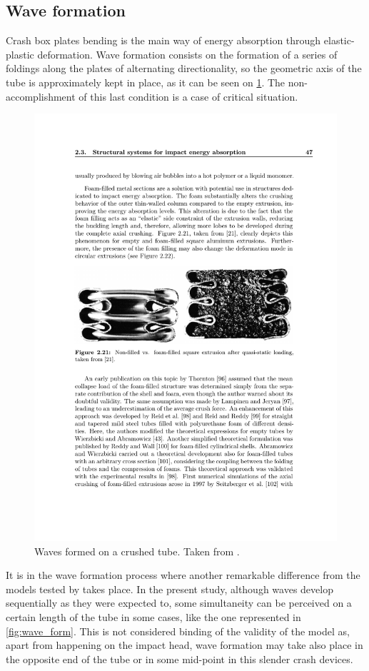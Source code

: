 \documentclass[cmfonts]{witpress}
\begin{document}
\subsection{Wave formation}
\label{sec:wave_formation}

Crash box plates bending is the main way of energy absorption through elastic-plastic deformation. Wave formation consists on the formation of a series of foldings along the plates of alternating directionality, so the geometric axis of the tube is approximately kept in place, as it can be seen on \cref{fig:waves}. The non-accomplishment of this last condition is a case of critical situation.

\begin{figure}
\centering
\includegraphics[width=0.7\linewidth]{figures/IMG_CUTRES/waves}
\caption[Waves formed on a crushed tube.]{Waves formed on a crushed tube. Taken from \cite{Langseth}.}
\label{fig:waves}
\end{figure}

It is in the wave formation process where another remarkable difference from the models tested by \cite{Scattina2011} takes place. In the present study, although waves develop sequentially as they were expected to, some simultaneity can be perceived on a certain length of the tube in some cases, like the one represented in \cref{fig:wave_form}. This is not considered binding of the validity of the model as, apart from happening on the impact head, wave formation may take also place in the opposite end of the tube or in some mid-point \cite{Abedrabbo2009, Costas2013} in this slender crash devices.
\end{document}
